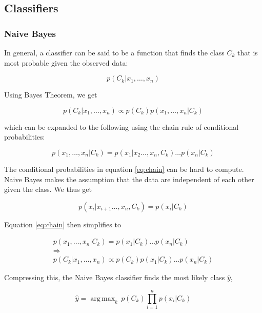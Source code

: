 \documentclass[10pt,letterpaper]{article}
\DeclareMathOperator*{\argmax}{arg\,max}
\begin{document}
	\subsection*{Classifiers}
	\subsubsection*{Naive Bayes}
	In general, a classifier can be said to be a function that finds the class $C_k$ that is most probable given the observed data:
	
	\begin{equation}
	p(C_k|x_1, \dots ,x_n)
	\end{equation}
	
	\noindent Using Bayes Theorem, we get
	
	\begin{equation}
	p(C_k|x_1,\dots,x_n) \propto p(C_k) p(x_1,\dots,x_n|C_k)
	\end{equation}
	
	\noindent which can be expanded to the following using the chain rule of conditional probabilities: 
	
	\begin{equation}
	\label{eq:chain}
	p(x_1,\dots,x_n|C_k) = p(x_1|x_2\dots,x_n,C_k) \dots p(x_n|C_k)
	\end{equation}
	
	\noindent The conditional probabilities in equation \ref{eq:chain} can be hard to compute. Naive Bayes makes the assumption that the data are independent of each other given the class. We thus get
	
	\begin{equation}
	p(x_i|x_{i+1}\dots,x_n,C_k) = p(x_i|C_k)
	\end{equation}
	
	\noindent Equation \ref{eq:chain} then simplifies to
	
	\begin{equation}
	\begin{gathered}
	p(x_1,\dots,x_n|C_k) = p(x_1|C_k) \dots p(x_n|C_k) \\
	\Rightarrow \\
	p(C_k|x_1,\dots,x_n) \propto p(C_k) p(x_1|C_k) \dots p(x_n|C_k)
	\end{gathered}
	\end{equation}
	
	\noindent Compressing this, the Naive Bayes classifier finds the most likely class $\hat{y}$,
	
	\begin{equation}
	\hat{y} = \argmax_{k} \, p(C_k) \prod_{i=1}^{n} p(x_i|C_k)    
	\end{equation}
	
\end{document}
